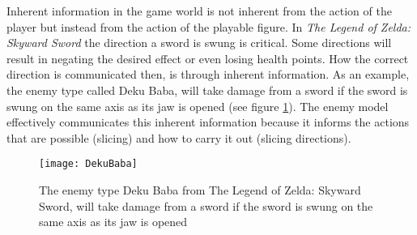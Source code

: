 Inherent information in the game world is not inherent from the action of the player but instead from the action of the playable figure. In \textit{The Legend of Zelda: Skyward Sword} \cite{skyward} the direction a sword is swung is critical. Some directions will result in negating the desired effect or even losing health points. How the correct direction is communicated then, is through inherent information. As an example, the enemy type called Deku Baba, will take damage from a sword if the sword is swung on the same axis as its jaw is opened (see figure \ref{dekubaba}). The enemy model effectively communicates this inherent information because it informs the actions that are possible (slicing) and how to carry it out (slicing directions).

\begin{figure}[h]
  \texttt{[image: DekuBaba]}
  \caption{The enemy type Deku Baba from The Legend of Zelda: Skyward Sword, will take damage from a sword if the sword is swung on the same axis as its jaw is opened}
  \label{dekubaba}
\end{figure}


